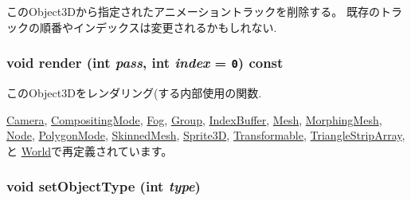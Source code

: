 このObject3Dから指定されたアニメーショントラックを削除する。 既存のトラックの順番やインデックスは変更されるかもしれない. \hypertarget{classm3g_1_1Object3D_1efcb1973989d9963d5bd6d03065d389}{
\subsubsection[{render}]{\setlength{\rightskip}{0pt plus 5cm}void render (int {\em pass}, \/  int {\em index} = {\tt 0}) const}}
\label{classm3g_1_1Object3D_1efcb1973989d9963d5bd6d03065d389}


このObject3Dをレンダリング(する内部使用の関数. 

\hyperlink{classm3g_1_1Camera_1efcb1973989d9963d5bd6d03065d389}{Camera}, \hyperlink{classm3g_1_1CompositingMode_1efcb1973989d9963d5bd6d03065d389}{CompositingMode}, \hyperlink{classm3g_1_1Fog_1efcb1973989d9963d5bd6d03065d389}{Fog}, \hyperlink{classm3g_1_1Group_1efcb1973989d9963d5bd6d03065d389}{Group}, \hyperlink{classm3g_1_1IndexBuffer_1efcb1973989d9963d5bd6d03065d389}{IndexBuffer}, \hyperlink{classm3g_1_1Mesh_1efcb1973989d9963d5bd6d03065d389}{Mesh}, \hyperlink{classm3g_1_1MorphingMesh_1efcb1973989d9963d5bd6d03065d389}{MorphingMesh}, \hyperlink{classm3g_1_1Node_1efcb1973989d9963d5bd6d03065d389}{Node}, \hyperlink{classm3g_1_1PolygonMode_1efcb1973989d9963d5bd6d03065d389}{PolygonMode}, \hyperlink{classm3g_1_1SkinnedMesh_1efcb1973989d9963d5bd6d03065d389}{SkinnedMesh}, \hyperlink{classm3g_1_1Sprite3D_1efcb1973989d9963d5bd6d03065d389}{Sprite3D}, \hyperlink{classm3g_1_1Transformable_1efcb1973989d9963d5bd6d03065d389}{Transformable}, \hyperlink{classm3g_1_1TriangleStripArray_1efcb1973989d9963d5bd6d03065d389}{TriangleStripArray}, と \hyperlink{classm3g_1_1World_1efcb1973989d9963d5bd6d03065d389}{World}で再定義されています。\hypertarget{classm3g_1_1Object3D_777701a101d1332abffa2ad6a255b91d}{
\subsubsection[{setObjectType}]{\setlength{\rightskip}{0pt plus 5cm}void setObjectType (int {\em type})}}
\label{classm3g_1_1Object3D_777701a101d1332abffa2ad6a255b91d}


